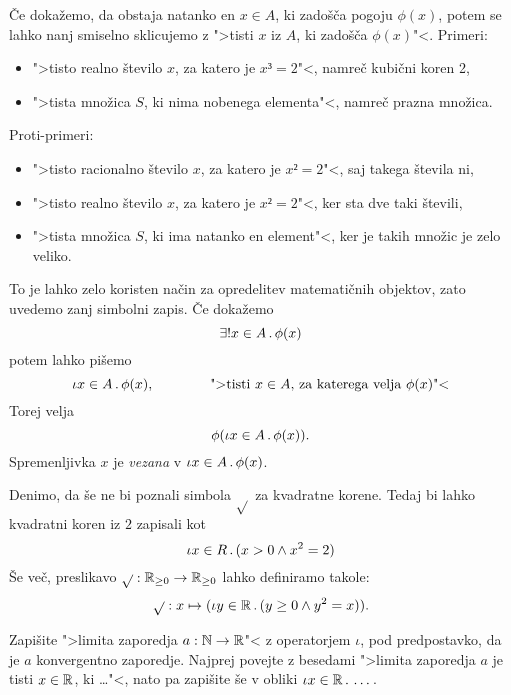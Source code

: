 Če dokažemo, da obstaja natanko en $x \in A$, ki zadošča pogoju $\phi(x)$, potem se lahko nanj smiselno sklicujemo z ">tisti $x$ iz $A$, ki zadošča $\phi(x)$"<. Primeri:
%
\begin{itemize}
\item ">tisto realno število $x$, za katero je $x³ = 2$"<, namreč kubični koren 2,
\item ">tista množica $S$, ki nima nobenega elementa"<, namreč prazna množica.
\end{itemize}
%
Proti-primeri:
%
\begin{itemize}
\item ">tisto racionalno število $x$, za katero je $x² = 2$"<, saj takega števila ni,
\item ">tisto realno število $x$, za katero je $x² = 2$"<, ker sta dve taki števili,
\item ">tista množica $S$, ki ima natanko en element"<, ker je takih množic je zelo veliko.
\end{itemize}
%
To je lahko zelo koristen način za opredelitev matematičnih objektov, zato uvedemo zanj simbolni zapis. Če dokažemo
%
\begin{equation*}
    \exists! x \in A \,.\, \phi(x)
\end{equation*}
%
potem lahko pišemo
%
\begin{equation*}
  \iota x \in A \,.\, \phi(x),
  \qquad\qquad\text{">tisti $x \in A$, za katerega velja $\phi(x)$"<}
\end{equation*}
%
Torej velja
%
\begin{equation*}
  \phi(\iota x \in A \,.\, \phi(x)).
\end{equation*}
%
Spremenljivka $x$ je \emph{vezana} v $\iota x \in A \,.\, \phi(x)$.

\begin{zgled}
  Denimo, da še ne bi poznali simbola $\sqrt{}$ za kvadratne korene. Tedaj bi
  lahko kvadratni koren iz $2$ zapisali kot
  \begin{equation*}
    \iota x \in R \,.\, (x > 0 \land x^2 = 2)
  \end{equation*}
  Še več, preslikavo $\sqrt{} : \mathbb{R}_{\geq 0} \to \mathbb{R}_{\geq 0}$ lahko definiramo takole:
  \begin{equation*}
    \sqrt{} : x \mapsto (\iota y \in \mathbb{R} \,.\, (y \geq 0 \land y^2 = x)).
  \end{equation*}
\end{zgled}

\begin{vaja}
  Zapišite ">limita zaporedja $a : \mathbb{N} \to \mathbb{R}$"< z operatorjem $\iota$, pod predpostavko,
  da je $a$ konvergentno zaporedje. Najprej povejte z besedami ">limita zaporedja $a$ je
  tisti $x \in \mathbb{R}$, ki \dots"<, nato pa zapišite še v obliki $\iota x \in \mathbb{R} \,.\, \dots$.
\end{vaja}


